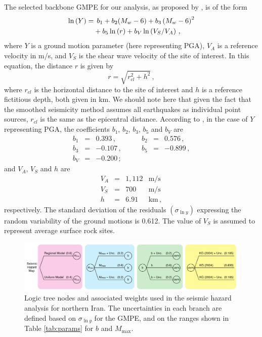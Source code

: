 The selected backbone GMPE for our analysis, as proposed by \citet{Kalkan2004}, is of the form
%
\begin{align}
	\ln \left( Y \right) =
		& \hspace{1ex} b_1 + b_2(M_w - 6) + b_3 \left( M_w - 6 \right)^{2} \nonumber \\
		& + b_5 \ln \left( r \right) + b_V \ln \left( V_S / V_A \right)
	\, ,
\end{align}
%
where $Y$ is a ground motion parameter (here representing PGA), $V_A$ is a reference velocity in m/s, and $V_S$ is the shear wave velocity of the site of interest. In this equation, the distance $r$ is given by
%
\begin{equation}
	r= \sqrt{ r^2_{\mathit{cl}} + h^2 }
	\, ,
\end{equation}
%
where $r_{\mathit{cl}}$ is the horizontal distance to the site of interest and $h$ is a reference fictitious depth, both given in km. We should note here that given the fact that the smoothed seismicity method assumes all earthquakes as individual point sources, $r_{\mathit{cl}}$ is the same as the epicentral distance. According to \citet{Kalkan2004}, in the case of $Y$ representing PGA, the coefficients $b_1$, $b_2$, $b_3$, $b_5$ and $b_V$ are
%
\begin{equation}
\begin{array}{lcrlcr}
	b_1 &=&  0.393   \,,&\hspace{2em}   b_2 &=& 0.576\,,   \\
	b_3 &=& -0.107   \,,&\hspace{2em}   b_5 &=& -0.899\,,  \\
	b_V &=& -0.200   \,;
	\nonumber
\end{array}
\end{equation}
%
and $V_A$, $V_S$ and $h$ are
%
\begin{equation}
\begin{array}{lcrl}
	V_A &=& 1,112 & \mathrm{m/s}	\\
	V_S &=&   700 & \mathrm{m/s}	\\
	h   &=&  6.91 & \mathrm{km}\,,
	\nonumber
\end{array}
\end{equation}
%
respectively. The standard deviation of the residuals $(\sigma_{\ln y})$ expressing the random variability of the ground motions is 0.612. The value of $V_S$ is assumed to represent average surface rock sites.

\begin{figure}[t]
    \centering
    \includegraphics[width=\textwidth]{figures/pdf/figure-09}
    \caption{Logic tree nodes and associated weights used in the seismic hazard analysis for northern Iran. The uncertainties in each branch are defined based on $\sigma_{\ln y}$ for the GMPE, and on the ranges shown in Table \ref{tab:params} for $b$ and $M_{\max}$.}
    \label{fig:logic}
\end{figure}

